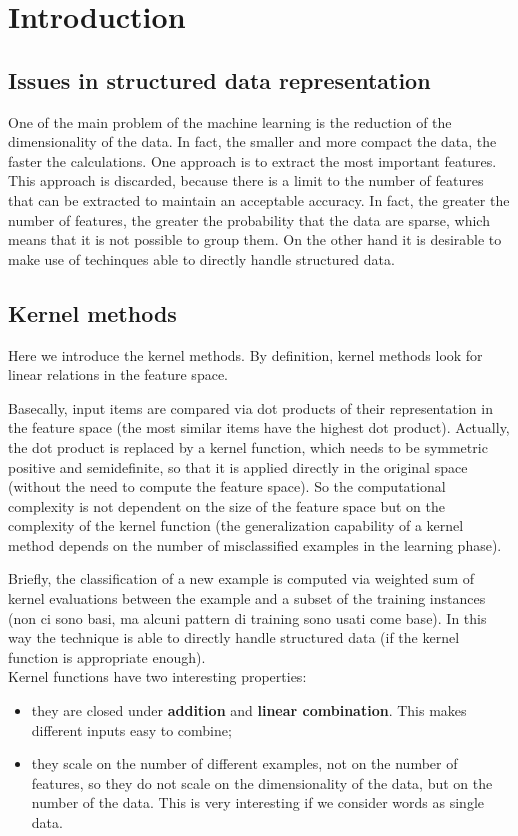 \section{Introduction}

\subsection{Issues in structured data representation}

One of the main problem of the machine learning is the reduction of the
dimensionality of the data. In fact, the smaller and more compact the data, the
faster the calculations. One approach is to extract the most important features.
This approach is discarded, because there is a limit to the number of features
that can be extracted to maintain an acceptable accuracy. In fact, the greater
the number of features, the greater the probability that the data are sparse,
which means that it is not possible to group them. On the other hand it is
desirable to make use of techinques able to directly handle structured data.

\subsection{Kernel methods}

Here we introduce the kernel methods. By definition, kernel methods look for
linear relations in the feature space.

Basecally, input items are compared via dot products of their representation in
the feature space (the most similar items have the highest dot product).
Actually, the dot product is replaced by a kernel function, which needs to be
symmetric positive and semidefinite, so that it is applied directly in the
original space (without the need to compute the feature space). So the
computational complexity is not dependent on the size of the feature space but
on the complexity of the kernel function (the generalization capability of a
kernel method depends on the number of misclassified examples in the learning
phase).

Briefly, the classification of a new example is computed via weighted sum of
kernel evaluations between the example and a subset of the training instances
(non ci sono basi, ma alcuni pattern di training sono usati come base). In this
way the technique is able to directly handle structured data (if the kernel
function is appropriate enough).\\
Kernel functions have two interesting properties:
\begin{itemize}
	\item they are closed under \textbf{addition} and \textbf{linear
		combination}. This makes different inputs easy to combine;

	\item they scale on the number of different examples, not on the number of
		features, so they do not scale on the dimensionality of the data, but on 
		the number of the data. This is very interesting if we consider 
		words as single data.
\end{itemize}

